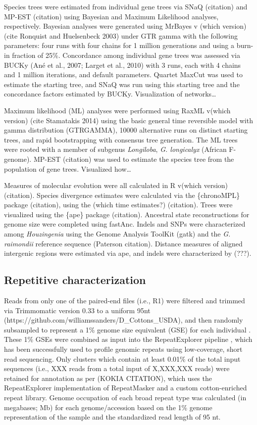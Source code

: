 \documentclass{bmcart}
\newcommand{\note}[2][]{\added[id=#1,remark={#2}]{}}
\begin{document}
Species trees were estimated from individual gene trees via SNaQ (citation) and MP-EST (citation) using Bayesian and Maximum Likelihood analyses, respectively. Bayesian analyses were generated using MrBayes v (which version) (cite Ronquist and Huelsenbeck 2003) under GTR gamma with the following parameters: four runs with four chains for 1 million generations and using a burn-in fraction of 25\%. Concordance among individual gene trees was assessed via BUCKy (Ané et al., 2007; Larget et al., 2010) with 3 runs, each with 4 chains and 1 million iterations, and default parameters. Quartet MaxCut was used to estimate the starting tree, and SNaQ was run using this starting tree and the concordance factors estimated by BUCKy. Visualization of networks\ldots

Maximum likelihood (ML) analyses were performed using RaxML v(which version) (cite Stamatakis 2014) using the basic general time reversible model with gamma distribution (GTRGAMMA), 10000 alternative runs on distinct starting trees, and rapid bootstrapping with consensus tree generation. The ML trees were rooted with a member of subgenus \textit{Longiloba}, \textit{G. longicalyx} (African F-genome). MP-EST (citation) was used to estimate the species tree from the population of gene trees.  Visualized how\ldots

Measures of molecular evolution were all calculated in R v(which version)(citation). Species divergence estimates were calculated via the \{chronoMPL\} package (citation), using the (which time estimates?) (citation). Trees were visualized using the \{ape\} package (citation). Ancestral state reconstructions for genome size were completed using {fastAnc}. Indels and SNPs were characterized among \textit{Houzingenia} using the Genome Analysis ToolKit (gatk) and the \textit{G. raimondii} reference sequence (Paterson citation). Distance measures of aligned intergenic regions were estimated via {ape}, and indels were characterized by (???). 

\subsection*{Repetitive characterization}
Reads from only one of the paired-end files (i.e., R1) were filtered and trimmed via Trimmomatic version 0.33 \cite{Bolger2014} to a uniform 95nt (https://github.com/williamssanders/D\_Cottons\_USDA), and then randomly subsampled to represent a 1\% genome size equivalent (GSE) for each individual \cite{Hendrix2005, Wendel2002}. These 1\% GSEs were combined as input into the RepeatExplorer pipeline \cite{Novak2013, Novak2010}, which has been successfully used to profile genomic repeats using low-coverage, short read sequencing. Only clusters which contain at least 0.01\% of the total input sequences (i.e., XXX \note[Corrinne]{numbers please}reads from a total input of X,XXX,XXX reads) were retained for annotation as per (KOKIA CITATION), which uses the RepeatExplorer implementation of RepeatMasker \cite{Smit2015} and a custom cotton-enriched repeat library. Genome occupation of each broad repeat type was calculated (in megabases; Mb) for each genome/accession based on the 1\% genome representation of the sample and the standardized read length of 95 nt. 
\end{document}

